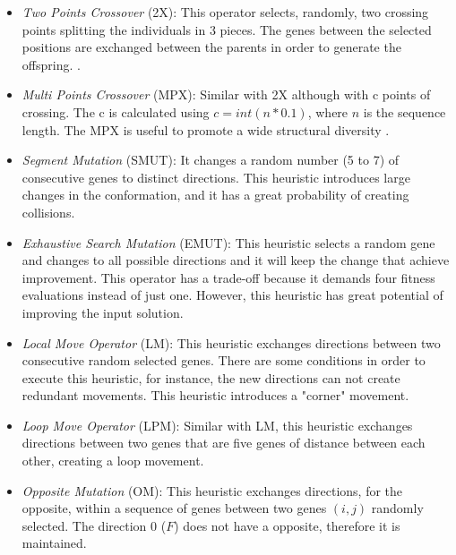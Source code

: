 \documentclass[conference]{IEEEtran}
\begin{document}
 
  \begin{itemize}
  	\item \textit{Two Points Crossover} (2X): This operator selects, randomly, two crossing points splitting the individuals in 3 pieces. The genes between the selected positions are exchanged between the parents in order to generate the offspring. \cite{benitez2015algoritmo}.
  	
  	
  	\item  \textit{Multi Points Crossover} (MPX): Similar with 2X although with c points of crossing. The c is calculated using  $c = int(n * 0.1)$, where $n$ is the sequence length. The MPX is useful to promote a wide structural diversity \cite{sabar2015automatic}.
  	
	\item \textit{Segment Mutation} (SMUT): It changes a random number (5 to 7) of consecutive genes to distinct directions. This heuristic introduces large changes in the conformation, and it has a great probability of creating collisions.  

	\item \textit {Exhaustive Search Mutation} (EMUT): This heuristic selects a random gene and changes to all possible directions and it will keep the change that achieve improvement. This operator has a trade-off because it demands four fitness evaluations instead of just one. However, this heuristic has great potential of improving the input solution.
	
	\item \textit{Local Move Operator} (LM): This heuristic exchanges directions between two consecutive random selected genes. There are some conditions in order to execute this heuristic, for instance, the new directions can not create redundant movements. This heuristic introduces a "corner" movement.
	
	\item \textit{Loop Move Operator} (LPM): Similar with LM, this heuristic exchanges directions between two genes that are five genes of distance between each other, creating a loop movement.
	
	
	\item \textit{Opposite Mutation} (OM): This heuristic exchanges directions, for the opposite, within a sequence of genes between two genes $(i,j)$ randomly selected. The direction 0 ($F$) does not have a opposite, therefore it is maintained. 
	
 \end{itemize} 	 
\end{document}
